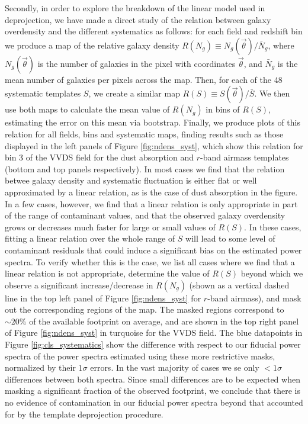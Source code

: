 \documentclass[a4paper,11pt]{article}
\newcommand{\nv}{\vec{\theta}}
\begin{document}
      Secondly, in order to explore the breakdown of the linear model used in deprojection, we have made a direct study of the relation between galaxy overdensity and the different systematics as follows: for each field and redshift bin we produce a map of the relative galaxy density $R(N_g)\equiv N_g(\nv)/\bar{N}_g$, where $N_g(\nv)$ is the number of galaxies in the pixel with coordinates $\nv$, and $\bar{N}_g$ is the mean number of galaxies per pixels across the map. Then, for each of the 48 systematic templates $S$, we create a similar map $R(S)\equiv S(\nv)/\bar{S}$. We then use both maps to calculate the mean value of $R(N_g)$ in bins of $R(S)$, estimating the error on this mean via bootstrap. Finally, we produce plots of this relation for all fields, bins and systematic maps, finding results such as those displayed in the left panels of Figure \ref{fig:ndens_syst}, which show this relation for bin 3 of the VVDS field for the dust absorption and $r$-band airmass templates (bottom and top panels respectively). In most cases we find that the relation betwee galaxy density and systematic fluctuation is either flat or well approximated by a linear relation, as is the case of dust absorption in the figure. In a few cases, however, we find that a linear relation is only appropriate in part of the range of contaminant values, and that the observed galaxy overdensity grows or decreases much faster for large or small values of $R(S)$. In these cases, fitting a linear relation over the whole range of $S$ will lead to some level of contaminant residuals that could induce a significant bias on the estimated power spectra. To verify whether this is the case, we list all cases where we find that a linear relation is not appropriate, determine the value of $R(S)$ beyond which we observe a significant increase/decrease in $R(N_g)$ (shown as a vertical dashed line in the top left panel of Figure \ref{fig:ndens_syst} for $r$-band airmass), and mask out the corresponding regions of the map. The masked regions correspond to $\sim20\%$ of the available footprint on average, and are shown in the top right panel of Figure \ref{fig:ndens_syst} in turquoise for the VVDS field. The blue datapoints in Figure \ref{fig:cls_systematics} show the difference with respect to our fiducial power spectra of the power spectra estimated using these more restrictive masks, normalized by their $1\sigma$ errors. In the vast majority of cases we se only $<1\sigma$ differences between both spectra. Since small differences are to be expected when masking a significant fraction of the observed footprint, we conclude that there is no evidence of contamination in our fiducial power spectra beyond that accounted for by the template deprojection procedure.
\end{document}
